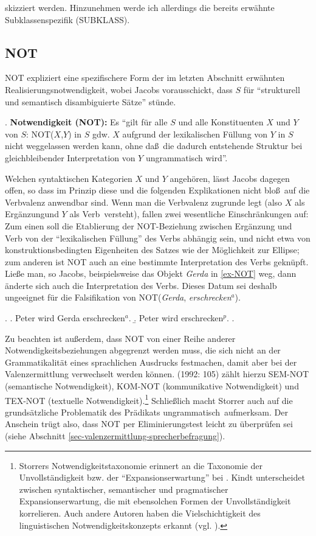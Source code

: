 \citet[Kapitel~4]{Jacobs:94} skizziert werden. Hinzunehmen werde ich allerdings die bereits erwähnte Subklassenspezifik (SUBKLASS).

\subsection{NOT}

NOT expliziert eine spezifischere Form der im letzten Abschnitt erwähnten Realisierungsnotwendigkeit, wobei Jacobs vorausschickt, dass $S$ für "`strukturell und semantisch disambiguierte Sätze"' stünde.

\ex. {\bf Notwendigkeit (NOT):} Es "`gilt für alle $S$ und alle Konstituenten $X$ und $Y$ von $S$: NOT($X$,$Y$) in $S$ gdw. $X$ aufgrund der lexikalischen Füllung von $Y$ in $S$ nicht weggelassen werden kann, ohne da\ss \ die dadurch entstehende Struktur bei gleichbleibender Interpretation von $Y$ ungrammatisch wird"'. \citep[14]{Jacobs:94}  

Welchen syntaktischen Kategorien $X$ und $Y$ angehören, lässt Jacobs dagegen offen, so dass im Prinzip diese und die folgenden Explikationen nicht blo\ss \ auf die Verbvalenz anwendbar sind. Wenn man die Verbvalenz zugrunde legt (also $X$ als \glq Ergänzung\grq und $Y$ als \glq Verb\grq\ versteht), fallen zwei wesentliche Einschränkungen auf: Zum einen soll die Etablierung der NOT-Bezie\-hung zwischen Ergänzung und Verb von der "`lexikalischen Füllung"' des Verbs abhängig sein, und nicht etwa von konstruktionsbedingten Eigenheiten des Satzes wie der Möglichkeit zur Ellipse; zum anderen ist NOT auch an eine bestimmte Interpretation des Verbs geknüpft. Lie\ss e man, so Jacobs, beispielsweise das Objekt {\it Gerda} in \ref{ex-NOT} weg, dann änderte sich auch die Interpretation des Verbs. Dieses Datum sei deshalb ungeeignet für die Falsifikation von NOT({\it Gerda}, {\it erschrecken$^a$}).

\ex. \label{ex-NOT}
\a. Peter wird Gerda erschrecken$^a$.
\b. Peter wird erschrecken$^p$.
\z. \citep[14f]{Jacobs:94}

Zu beachten ist au\ss erdem, dass NOT von einer Reihe anderer Notwendigkeitsbeziehungen abgegrenzt werden muss, die sich nicht an der Grammatikalität eines sprachlichen Ausdrucks festmachen, damit aber bei der Valenzermittlung verwechselt werden können. \citeauthor{Storrer:92} (1992: 105) zählt hierzu SEM-NOT (semantische Notwendigkeit), KOM-NOT (kommunikative Notwendigkeit) und TEX-NOT (textuelle Notwendigkeit).\footnote{Storrers Notwendigkeitstaxonomie erinnert an die Taxonomie der Unvollständigkeit bzw. der "`Expansionserwartung"' bei \cite{Kindt:85}. Kindt unterscheidet zwischen syntaktischer, semantischer und pragmatischer Expansionserwartung, die mit ebensolchen Formen der Unvollständigkeit korrelieren. Auch andere Autoren haben die Vielschichtigkeit des linguistischen Notwendigkeitskonzepts erkannt (vgl. \citealt[226]{Vater:81}).} Schlie\ss lich macht Storrer auch auf die grundsätzliche Problematik des Prädikats \glq ungrammatisch\grq\ aufmerksam. Der Anschein trügt also, dass NOT per Eliminierungstest leicht zu überprüfen sei (siehe Abschnitt \ref{sec-valenzermittlung-sprecherbefragung}).

